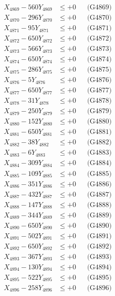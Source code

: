 \documentclass[a4paper,10pt]{article}
\begin{document}
{\begin{align}
X_{4869} - 560Y_{4869} &\leq +0 && \text{(G4869)} \\
X_{4870} - 296Y_{4870} &\leq +0 && \text{(G4870)} \\
\allowbreak
X_{4871} - 95Y_{4871} &\leq +0 && \text{(G4871)} \\
X_{4872} - 650Y_{4872} &\leq +0 && \text{(G4872)} \\
X_{4873} - 566Y_{4873} &\leq +0 && \text{(G4873)} \\
X_{4874} - 650Y_{4874} &\leq +0 && \text{(G4874)} \\
X_{4875} - 286Y_{4875} &\leq +0 && \text{(G4875)} \\
X_{4876} - 5Y_{4876} &\leq +0 && \text{(G4876)} \\
X_{4877} - 650Y_{4877} &\leq +0 && \text{(G4877)} \\
X_{4878} - 31Y_{4878} &\leq +0 && \text{(G4878)} \\
X_{4879} - 250Y_{4879} &\leq +0 && \text{(G4879)} \\
X_{4880} - 152Y_{4880} &\leq +0 && \text{(G4880)} \\
\allowbreak
X_{4881} - 650Y_{4881} &\leq +0 && \text{(G4881)} \\
X_{4882} - 38Y_{4882} &\leq +0 && \text{(G4882)} \\
X_{4883} - 6Y_{4883} &\leq +0 && \text{(G4883)} \\
X_{4884} - 309Y_{4884} &\leq +0 && \text{(G4884)} \\
X_{4885} - 109Y_{4885} &\leq +0 && \text{(G4885)} \\
X_{4886} - 351Y_{4886} &\leq +0 && \text{(G4886)} \\
X_{4887} - 432Y_{4887} &\leq +0 && \text{(G4887)} \\
X_{4888} - 147Y_{4888} &\leq +0 && \text{(G4888)} \\
X_{4889} - 344Y_{4889} &\leq +0 && \text{(G4889)} \\
X_{4890} - 650Y_{4890} &\leq +0 && \text{(G4890)} \\
\allowbreak
X_{4891} - 502Y_{4891} &\leq +0 && \text{(G4891)} \\
X_{4892} - 650Y_{4892} &\leq +0 && \text{(G4892)} \\
X_{4893} - 367Y_{4893} &\leq +0 && \text{(G4893)} \\
X_{4894} - 130Y_{4894} &\leq +0 && \text{(G4894)} \\
X_{4895} - 522Y_{4895} &\leq +0 && \text{(G4895)} \\
X_{4896} - 258Y_{4896} &\leq +0 && \text{(G4896)} \\

\end{align}}
\end{document}

